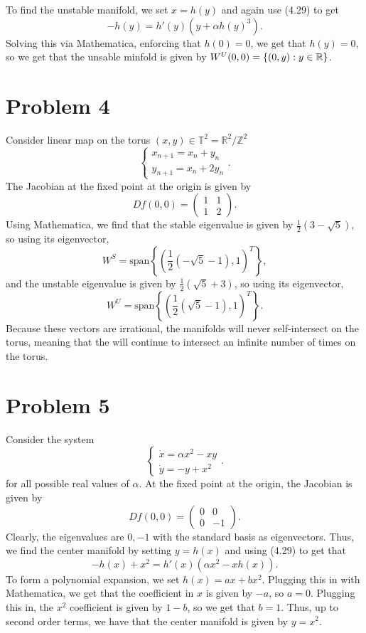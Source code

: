\documentclass{article}
\begin{document}
To find the unstable manifold, we set $x=h(y)$ and again use (4.29) to get
\[
-h(y)=h'(y)(y+\alpha h(y)^3).
\]
Solving this via Mathematica, enforcing that $h(0)=0$, we get that $h(y)=0$, so we get that the unsable minfold is given by $W^U(0,0)=\{(0,y):y\in\mathbb{R}\}$.

\section{Problem 4}
Consider linear map on the torus $(x,y) \in \mathbb{T}^2 =  \mathbb{R}^2  /  \mathbb{Z}^2$
\begin{equation*}
	\left\{\begin{array}{l}
		x_{n+1} = x_n + y_n \\
		y_{n+1} = x_n + 2 y_n  
	\end{array}\right..
\end{equation*}
The Jacobian at the fixed point at the origin is given by
\[
Df(0,0)=\begin{pmatrix}
	1&1\\
	1&2
\end{pmatrix}.
\]
Using Mathematica, we find that the stable eigenvalue is given by $\frac{1}{2} \left(3-\sqrt{5}\right)$, so using its eigenvector,
\[
W^S=\text{span}\left\{\left(\frac{1}{2} \left(-\sqrt{5}-1\right),1\right)^T\right\},
\]
and the unstable eigenvalue is given by $\frac{1}{2} \left(\sqrt{5}+3\right)$, so using its eigenvector,
\[
W^U=\text{span}\left\{\left(\frac{1}{2} \left(\sqrt{5}-1\right),1\right)^T\right\}.
\]
Because these vectors are irrational, the manifolds will never self-intersect on the torus, meaning that the will continue to intersect an infinite number of times on the torus.

\section{Problem 5}
Consider the system 
\begin{equation*}
	\left\{\begin{array}{l}
		\dot x= \alpha x^2 -xy \\
		\dot y = -y + x^2 
	\end{array}\right..
\end{equation*}
for all possible real values of $\alpha$. At the fixed point at the origin, the Jacobian is given by
\[
Df(0,0)=\begin{pmatrix}
	0&0\\
	0&-1
\end{pmatrix}.
\]
Clearly, the eigenvalues are $0,-1$ with the standard basis as eigenvectors. Thus, we find the center manifold by setting $y=h(x)$ and using (4.29) to get that
\[
-h(x)+x^2=h'(x)(\alpha x^2 -xh(x)).
\] 
To form a polynomial expansion, we set $h(x)=ax+bx^2$. Plugging this in with Mathematica, we get that the coefficient in $x$ is given by $-a$, so $a=0$. Plugging this in, the $x^2$ coefficient is given by $1-b$, so we get that $b=1$. Thus, up to second order terms, we have that the center manifold is given by $y=x^2$.
\end{document}
